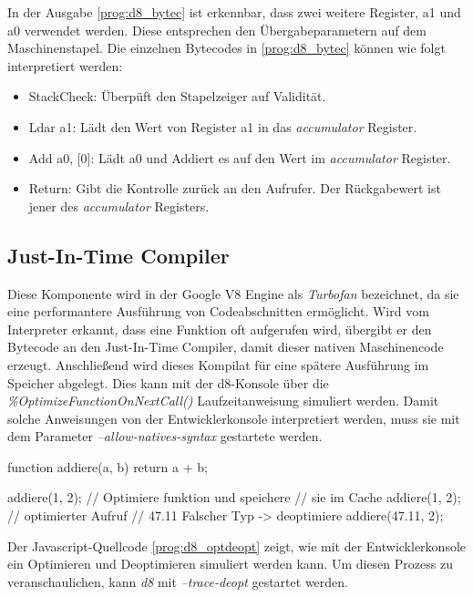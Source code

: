 In der Ausgabe \ref{prog:d8_bytec} ist erkennbar, dass zwei weitere Register, a1 und a0 verwendet werden. Diese entsprechen den
Übergabeparametern auf dem Maschinenstapel. Die einzelnen Bytecodes in \ref{prog:d8_bytec} können wie folgt interpretiert werden:


\begin{itemize}
	\item StackCheck: Überpüft den Stapelzeiger auf Validität.
	\item Ldar a1: Lädt den Wert von Register a1 in das \textit{accumulator} Register.
	\item Add a0, [0]: Lädt a0 und Addiert es auf den Wert im \textit{accumulator} Register.
	\item Return: Gibt die Kontrolle zurück an den Aufrufer. Der Rückgabewert ist jener des \textit{accumulator} Registers.
\end{itemize}


\subsection{Just-In-Time Compiler}

Diese Komponente wird in der Google V8 Engine als \textit{Turbofan} bezeichnet, da sie eine performantere Ausführung
von Codeabschnitten ermöglicht. Wird vom Interpreter erkannt, dass eine Funktion oft aufgerufen wird,
übergibt er den Bytecode an den Just-In-Time Compiler, damit dieser nativen Maschinencode erzeugt. Anschließend
wird dieses Kompilat für eine spätere Ausführung im Speicher abgelegt.
Dies kann mit der d8-Konsole über die \textit{\%OptimizeFunctionOnNextCall()} Laufzeitanweisung simuliert werden. 
Damit solche Anweisungen von der Entwicklerkonsole interpretiert werden, muss sie mit dem Parameter \textit{--allow-natives-syntax} 
gestartete werden.

\begin{program}[h]
\caption{Optimierung und Deoptimierung.}
\label{prog:d8_optdeopt}
\begin{GenericCode}
function addiere(a, b) {
	return a + b;
}

addiere(1, 2);
// Optimiere funktion und speichere 
// sie im Cache
addiere(1, 2); // optimierter Aufruf
// 47.11 Falscher Typ -> deoptimiere
addiere(47.11, 2);	
\end{GenericCode}
\end{program}

Der Javascript-Quellcode \ref{prog:d8_optdeopt} zeigt, wie mit der Entwicklerkonsole ein Optimieren und Deoptimieren simuliert werden
kann. Um diesen Prozess zu veranschaulichen, kann \textit{d8} mit \textit{--trace-deopt} gestartet werden. \\


